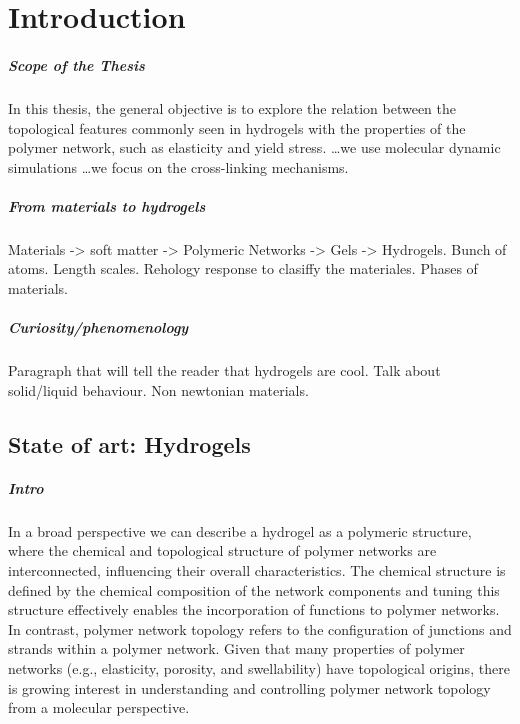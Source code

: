 \chapter{Introduction}\label{ch1:Intro}


\paragraph{Scope of the Thesis} In this thesis, the general objective is to explore the relation between the topological features commonly seen in hydrogels with the properties of the polymer network, such as elasticity and yield stress.
\dots we use molecular dynamic simulations \dots we focus on the cross-linking mechanisms.




\paragraph{From materials to hydrogels} Materials -> soft matter -> Polymeric Networks -> Gels -> Hydrogels.
Bunch of atoms.
Length scales.
Rehology response to clasiffy the materiales.
Phases of materials.

\paragraph{Curiosity/phenomenology} Paragraph that will tell the reader that hydrogels are cool.
Talk about solid/liquid behaviour.
Non newtonian materials.



\section{State of art: Hydrogels}

\paragraph{Intro} In a broad perspective we can describe a hydrogel as a polymeric structure, where the chemical and topological structure of polymer networks are interconnected, influencing their overall characteristics.
The chemical structure is defined by the chemical composition of the network components and tuning this structure effectively enables the incorporation of functions to polymer networks.
In contrast, polymer network topology refers to the configuration of junctions and strands within a polymer network.
Given that many properties of polymer networks (e.g., elasticity, porosity, and swellability) have topological origins, there is growing interest in understanding and controlling polymer network topology from a molecular perspective\citep{guPolymerNetworksPlastics2020}.

